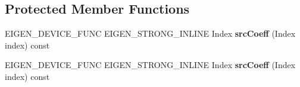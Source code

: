 \subsection*{Protected Member Functions}
\begin{DoxyCompactItemize}
\item 
\mbox{\label{struct_eigen_1_1_tensor_evaluator_3_01const_01_tensor_chipping_op_3_01_dim_id_00_01_arg_type_01_4_00_01_device_01_4_a137e0cf48d2d3b67f900629f9045ff48}} 
E\+I\+G\+E\+N\+\_\+\+D\+E\+V\+I\+C\+E\+\_\+\+F\+U\+NC E\+I\+G\+E\+N\+\_\+\+S\+T\+R\+O\+N\+G\+\_\+\+I\+N\+L\+I\+NE Index {\bfseries src\+Coeff} (Index index) const
\item 
\mbox{\label{struct_eigen_1_1_tensor_evaluator_3_01const_01_tensor_chipping_op_3_01_dim_id_00_01_arg_type_01_4_00_01_device_01_4_a137e0cf48d2d3b67f900629f9045ff48}} 
E\+I\+G\+E\+N\+\_\+\+D\+E\+V\+I\+C\+E\+\_\+\+F\+U\+NC E\+I\+G\+E\+N\+\_\+\+S\+T\+R\+O\+N\+G\+\_\+\+I\+N\+L\+I\+NE Index {\bfseries src\+Coeff} (Index index) const
\end{DoxyCompactItemize}
